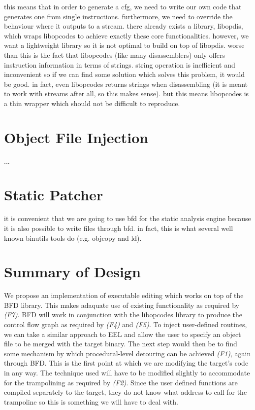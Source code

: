 this means that in order to generate a cfg, we need to write our own code that generates one from single instructions. furthermore, we need to override the behaviour where it outputs to a stream. there already exists a library, libopdis, which wraps libopcodes to achieve exactly these core functionalities. however, we want a lightweight library so it is not optimal to build on top of libopdis. worse than this is the fact that libopcodes (like many disassemblers) only offers instruction information in terms of strings. string operation is inefficient and inconvenient so if we can find some solution which solves this problem, it would be good. in fact, even libopcodes returns strings when disassembling (it is meant to work with streams after all, so this makes sense). but this means libopcodes is a thin wrapper which should not be difficult to reproduce.

\section{Object File Injection}

...

\section{Static Patcher}

it is convenient that we are going to use bfd for the static analysis engine because it is also possible to write files through bfd. in fact, this is what several well known binutils tools do (e.g. objcopy and ld).

\section{Summary of Design}

We propose an implementation of executable editing which works on top of the BFD library. This makes adaquate use of existing functionality as required by \emph{(F7)}. BFD will work in conjunction with the libopcodes library to produce the control flow graph as required by \emph{(F4)} and \emph{(F5)}. To inject user-defined routines, we can take a similar approach to EEL and allow the user to specify an object file to be merged with the target binary. The next step would then be to find some mechanism by which procedural-level detouring can be achieved \emph{(F1)}, again through BFD. This is the first point at which we are modifying the target's code in any way. The technique used will have to be modified slightly to accommodate for the trampolining as required by \emph{(F2)}. Since the user defined functions are compiled separately to the target, they do not know what address to call for the trampoline so this is something we will have to deal with.